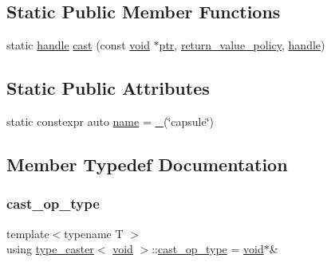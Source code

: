 \subsection*{Static Public Member Functions}
\begin{DoxyCompactItemize}
\item 
static \mbox{\hyperlink{classhandle}{handle}} \mbox{\hyperlink{classtype__caster_3_01void_01_4_a70b8f85942ed923f69e16fb949c22ea6}{cast}} (const \mbox{\hyperlink{_s_d_l__opengles2__gl2ext_8h_ae5d8fa23ad07c48bb609509eae494c95}{void}} $\ast$\mbox{\hyperlink{pystrtod_8h_a671b2e1a427060ad8b5362882ed58f5b}{ptr}}, \mbox{\hyperlink{detail_2common_8h_adde72ab1fb0dd4b48a5232c349a53841}{return\+\_\+value\+\_\+policy}}, \mbox{\hyperlink{classhandle}{handle}})
\end{DoxyCompactItemize}
\subsection*{Static Public Attributes}
\begin{DoxyCompactItemize}
\item 
static constexpr auto \mbox{\hyperlink{classtype__caster_3_01void_01_4_ac118efe07d462b63f42890e5e0bd0444}{name}} = \mbox{\hyperlink{descr_8h_af114703e20c6527e87163eb2798f74b8}{\+\_\+}}(\char`\"{}capsule\char`\"{})
\end{DoxyCompactItemize}


\subsection{Member Typedef Documentation}
\mbox{\label{classtype__caster_3_01void_01_4_a334e9bada1b4be4c9b42fe4f1e1784a4}} 
\subsubsection{\texorpdfstring{cast\_op\_type}{cast\_op\_type}}
{\footnotesize\ttfamily template$<$typename T $>$ \\
using \mbox{\hyperlink{classtype__caster}{type\+\_\+caster}}$<$ \mbox{\hyperlink{_s_d_l__opengles2__gl2ext_8h_ae5d8fa23ad07c48bb609509eae494c95}{void}} $>$\+::\mbox{\hyperlink{classtype__caster_3_01void_01_4_a334e9bada1b4be4c9b42fe4f1e1784a4}{cast\+\_\+op\+\_\+type}} =  \mbox{\hyperlink{_s_d_l__opengles2__gl2ext_8h_ae5d8fa23ad07c48bb609509eae494c95}{void}}$\ast$\&}



